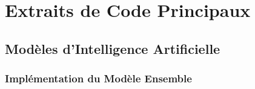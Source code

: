 
\chapter{Extraits de Code Principaux}
\label{annexe:code}

\section{Modèles d'Intelligence Artificielle}

\subsection{Implémentation du Modèle Ensemble}

